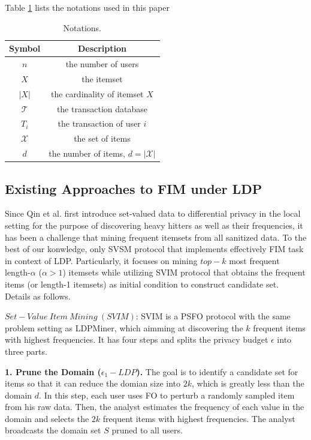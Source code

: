 \documentclass[conference]{IEEEtran}
\begin{document}
{\color{red}Table \ref{notations} lists the notations used in this paper}

\begin{table}[!t]
\caption{Notations.}
\begin{center}
\begin{tabular}{|c|c|}\hline
  Symbol&Description \\\hline
  $n$ & the number of users \\\hline
  $X$ & the itemset \\\hline
  $|X|$ & the cardinality of itemset $X$ \\\hline
  $\mathcal{T}$ & the transaction database \\\hline
  $T_i$ & the transaction of user $i$ \\\hline
  $\mathcal{X}$ & the set of items \\\hline
  $d$ & the number of items, $d = |\mathcal{X}|$ \\\hline
\end{tabular}
\label{notations}
\end{center}
\end{table}

\subsection{Existing Approaches to FIM under LDP}
Since Qin et al.\cite{a1} first introduce set-valued data to differential privacy in the local setting for the purpose of discovering heavy hitters as well as their frequencies, it has been a challenge that mining frequent itemsets from all sanitized data. To the best of our konwledge, only SVSM\cite{a2} protocol that implements effectively FIM task in context of LDP. Particularly, it focuses on mining $top-k$ most frequent length-$\alpha$ ($\alpha>1$) itemsets while utilizing SVIM\cite{a2} protocol that obtains the frequent items (or length-1 itemsets) as initial condition to construct candidate set. Details as follows. 

$Set-Value\ Item\ Mining\ (SVIM)$: SVIM is a PSFO protocol with the same problem setting as LDPMiner\cite{a1}, which aimming at discovering the $k$ frequent items with highest frequencies. It has four steps and {\color{red}splits the privacy budget $\epsilon$ into three parts.}

\textbf{1. Prune the Domain ($\epsilon_1-LDP$).} The goal is to identify a candidate set for items so that it can reduce the domian size into $2k$, which is greatly less than the domain $d$. In this step, each user uses FO to perturb a randomly sampled item from his raw data. Then, the analyst estimates the frequency of each value in the domain and selects the $2k$ frequent items with highest frequencies. The analyst broadcasts the domain set $S$ pruned to all users.
\end{document}
